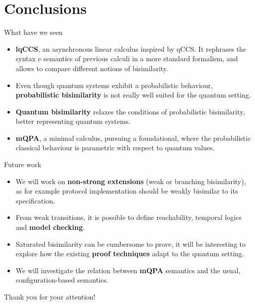 \documentclass{beamer}
\begin{document}
\section{Conclusions}
\begin{frame}{What have we seen}
\begin{itemize}
\item<2-> \textbf{lqCCS}, an asynchronous linear calculus inspired by  qCCS. It rephrases the syntax e semantics of previous calculi in a more standard formalism, and allows to compare different notions of bisimilarity. 
\item<3-> Even though quantum systems exhibit a probabilistic behaviour, \textbf{probabilistic bisimilarity} is not really well suited for the quantum setting. 
\item<4-> \textbf{Quantum bisimilarity} relaxes the conditions of probabilistic bisimilarity, better representing quantum systems.
\item<5-> \textbf{mQPA}, a minimal calculus, pursuing a foundational, where the probabilistic classical behaviour is parametric with respect to quantum values.
\end{itemize}
\end{frame}


\begin{frame}{Future work}
\begin{itemize}
\item<2-> We will work on \textbf{non-strong extensions} (weak or branching bisimilarity), as for example protocol implementation should be weakly bisimilar to its specification.
\item<3->  From weak transitions, it is possible to define reachability, temporal logics and \textbf{model checking}.
\item<4->  Saturated bisimilarity can be cumbersome to prove, it will be interesting to explore how the existing \textbf{proof techniques} adapt to the quantum setting.
\item<5->  We will investigate the relation between \textbf{mQPA} semantics and the usual, configuration-based semantics.
\end{itemize}
\end{frame}

\begin{frame}
\bigskip
\begin{Large}
\begin{center}
Thank you for your attention!
\end{center}
\end{Large}
\end{frame}
\end{document}
